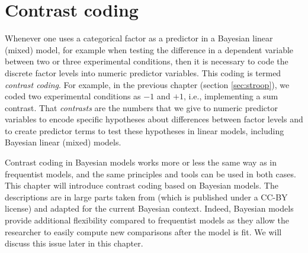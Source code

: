 \documentclass[12pt,]{krantz}
\theoremstyle{definition}
\theoremstyle{definition}
\theoremstyle{definition}
\theoremstyle{remark}
\begin{document}
\chapter{Contrast coding}\label{ch:contr}

Whenever one uses a categorical factor as a predictor in a Bayesian
linear (mixed) model, for example when testing the difference in a
dependent variable between two or three experimental conditions, then it
is necessary to code the discrete factor levels into numeric predictor
variables. This coding is termed \emph{contrast coding}. For example, in
the previous chapter (section \ref{sec:stroop}), we coded two
experimental conditions as \(-1\) and \(+1\), i.e., implementing a sum
contrast. That \emph{contrasts} are the numbers that we give to numeric
predictor variables to encode specific hypotheses about differences
between factor levels and to create predictor terms to test these
hypotheses in linear models, including Bayesian linear (mixed) models.

Contrast coding in Bayesian models works more or less the same way as in
frequentist models, and the same principles and tools can be used in
both cases. This chapter will introduce contrast coding based on
Bayesian models. The descriptions are in large parts taken from
\citet{schad2020capitalize} (which is published under a CC-BY license)
and adapted for the current Bayesian context. Indeed, Bayesian models
provide additional flexibility compared to frequentist models as they
allow the researcher to easily compute new comparisons after the model
is fit. We will discuss this issue later in this chapter.
\end{document}
